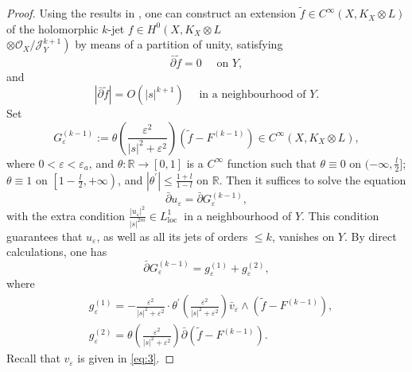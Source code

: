 \documentclass[lang=en,12pt,twoside]{textbook}
\begin{document}
\begin{proof}
Using the results in \cite[p12]{Popovici2004L2EF}, one can construct an extension $\tilde{f} \in C^{\infty}\left(X, K_X \otimes L\right)$ of the holomorphic $k$-jet $f \in H^0\left(X, K_X \otimes L\right.$\\ $\left. \otimes \mathcal{O}_X / \mathcal{J}_Y^{k+1}\right)$ by means of a partition of unity, satisfying
$$
\bar{\partial} \tilde{f}=0 \quad \text { on } Y ,
$$
and
$$
|\bar{\partial} \tilde{f}|=O\left(|s|^{k+1}\right) \quad \text { in a neighbourhood of } Y .
$$
{\color{purple} Set
$$
G_{\varepsilon}^{(k-1)}:=\theta\left(\frac{\varepsilon^2}{|s|^2+\varepsilon^2}\right)\left(\tilde{f}-F^{(k-1)}\right) \in C^{\infty}\left(X, K_X \otimes L\right),
$$}
where $0<\varepsilon<\varepsilon_a$, and $\theta: \mathbb{R} \rightarrow[0,1]$ is a $C^{\infty}$ function such that $\theta \equiv 0$ on $(-\infty, \frac{l}{2}]$; $\theta \equiv 1$ on $\left[1-\frac{l}{2},+\infty\right)$, and $\left|\theta^{\prime}\right| \leq \frac{1+l}{1-l}$ on $\mathbb{R}$. {\color{purple} Then it suffices to solve the equation
\begin{equation}\label{eq:target}
  \bar{\partial} u_{\varepsilon}=\bar{\partial} G_{\varepsilon}^{(k-1)},
\end{equation}
with the extra condition $\frac{\left|u_{\varepsilon}\right|^2}{ |s|^{2m}} \in L_{\text {loc }}^1$ in a neighbourhood of $Y$. This condition guarantees that $u_{\varepsilon}$, as well as all its jets of orders $\leq k$, vanishes on $Y$.}
By direct calculations, one has
$$
\bar{\partial} G_{\varepsilon}^{(k-1)}=g_{\varepsilon}^{(1)}+g_{\varepsilon}^{(2)},
$$
where
$$
\begin{aligned}
& g_{\varepsilon}^{(1)}=-\frac{\varepsilon^2}{|s|^2+\varepsilon^2} \cdot \theta^{\prime}\left(\frac{\varepsilon^2}{|s|^2+\varepsilon^2}\right) \bar{v}_{\varepsilon} \wedge\left(\tilde{f}-F^{(k-1)}\right), \\
& g_{\varepsilon}^{(2)}=\theta\left(\frac{\varepsilon^2}{|s|^2+\varepsilon^2}\right) \bar{\partial}\left(\tilde{f}-F^{(k-1)}\right) .
\end{aligned}
$$
Recall that $v_{\varepsilon}$ is given in \eqref{eq:3}.



\end{proof}
\end{document}
